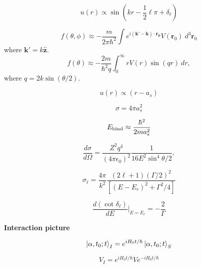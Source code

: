 \documentclass[11pt]{article}
\newcommand{\vect}[1]{\boldsymbol{\mathbf{#1}}}
\begin{document}
\begin{multicols}{2}
\begin{equation}
u(r) \propto \sin \left( kr - \frac{1}{2}\ell\pi+\delta_{\ell}
                  \right)
\end{equation}

\begin{equation}
f(\theta,\phi) \approx - \frac{m}{2\pi\hbar^2}
                 \int e^{i(\vect{k'}-\vect{k}) \cdot \vect{r_0}} V(\vect{r}_0)
                      \: d^3 \vect{r}_0
\end{equation}
where $\vect{k'} = k \vect{\hat{z}}$.
\begin{equation}
f(\theta) \approx - \frac{2m}{\hbar^2 q}
          \int_{0}^{\infty} r V(r) \sin(q r) \: dr,
\end{equation}
where $q = 2 k \sin(\theta/2)$.

\begin{equation}
u(r) \propto (r - a_s)
\end{equation}

\begin{equation}
\sigma = 4\pi a_s^2
\end{equation}

\begin{equation}
E_{\rm bind} \approx \frac{\hbar^2}{2ma_s^2}
\end{equation}

\begin{equation}
  \frac{d\sigma}{d\Omega} = \frac{Z^2 q^4}{(4\pi\epsilon_0)^2}
  \frac{1}{16E^2 \sin^4 \theta/2} ,
\end{equation}

\begin{equation}
  \sigma_{\ell} = \frac{4\pi}{k^2}
                  \frac{(2\ell+1)(\Gamma/2)^2}{[(E-E_r)^2+\Gamma^2/4]}
\end{equation}

\begin{equation}
\frac{d(\cot \delta_{\ell})}{dE} \bigg\rvert_{E=E_r} = - \frac{2}{\Gamma}
\end{equation}


{\bf Interaction picture}

\begin{equation} %
\ket{\alpha,t_0;t}_{I} =
  e^{iH_0t/\hbar} \ket{\alpha,t_0;t}_{S}
\end{equation}

\begin{equation} %
V_I = e^{iH_0t/\hbar}Ve^{-iH_0t/\hbar}
\end{equation}


\end{multicols}
\end{document}
